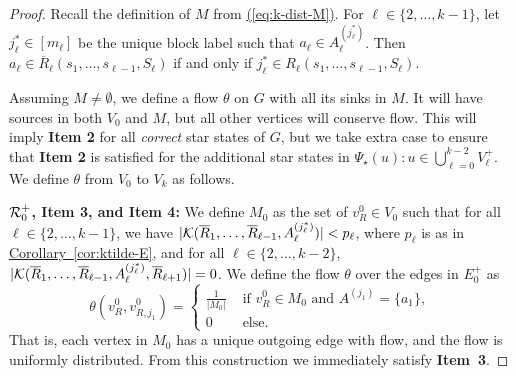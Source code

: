 \documentclass{article}
\newcommand{\eq}[1]{\hyperref[eq:#1]{(\ref*{eq:#1})}}
\newcommand{\cor}[1]{\hyperref[cor:#1]{Corollary~\ref*{cor:#1}}}
\renewcommand{\>}{\rangle}
\newcommand{\<}{\langle}
\renewcommand{\(}{\left(}
\renewcommand{\)}{\right)}
\def\abs#1{\left| #1 \right|}
\begin{document}
\begin{proof}
	Recall the definition of $M$ from \eq{k-dist-M}. For $\ell \in \{2,\dots,k-1\}$, let $j^*_{\ell}\in [m_{\ell}]$ be the unique block label such that $a_{\ell}\in A_{\ell}^{(j_{\ell}^*)}$. Then $a_{\ell}\in \overline{R}_{\ell}(s_1,\dots,s_{\ell-1},S_{\ell})$ if and only if $j_{\ell}^*\in R_{\ell}(s_1,\dots,s_{\ell-1},S_{\ell})$. 
	
	Assuming $M\neq\emptyset$, we define a flow $\theta$ on $G$ with all its sinks in $M$. It will have sources in both $V_0$ and $M$, but all other vertices will conserve flow. This will imply \textbf{Item 2} for all \emph{correct} star states of $G$, but we take extra case to ensure that \textbf{Item 2} is satisfied for the additional star states in $\Psi_\star(u):u\in \bigcup_{\ell=0}^{k-2}V_{\ell}^+$. We define $\theta$ from $V_0$ to $V_k$ as follows.

\vskip7pt
\noindent\textbf{${\cal R}_{0}^+$, Item 3, and Item 4:} We define $M_0$ as the set of $v^{0}_{R}\in V_0$ such that for all $\ell \in \{2,\dots,k-1\}$, we have $|{\cal K}(\overline{R}_1,\dots,\overline{R}_{\ell-1},A_{\ell}^{(j^*_{\ell})})|< p_{\ell}$, where $p_{\ell}$ is as in \cor{ktilde-E}, and for all $\ell\in\{2,\dots,k-2\}$, $|{\cal K}(\overline{R}_1,\dots,\overline{R}_{\ell-1},A_{\ell}^{(j_{\ell}^*)},\overline{R}_{\ell+1})| = 0$. We define the flow $\theta$ over the edges in $E_0^{+}$ as 
		$$ \theta\left(v^{0}_{R},v^{0}_{R,j_1}\right) = \begin{cases}
			\frac{1}{\abs{M_0}} &\text{ if } v_{R}^0 \in M_0 \text{ and } A^{(j_1)} = \{a_1\},\\
			0 &\text{ else}.
		\end{cases}$$
		That is, each vertex in $M_0$ has a unique outgoing edge with flow, and the flow is uniformly distributed. From this construction we immediately satisfy \textbf{Item~3}. 
		

\end{proof}
\end{document}
